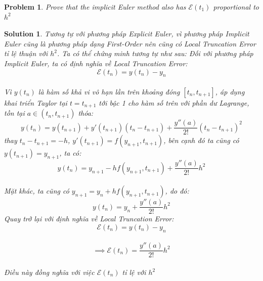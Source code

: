 \documentclass[a4paper]{article}
\newtheorem*{problem}{Problem}
\newtheorem*{sol}{Solution}
\begin{document}
\begin{problem}
    Prove that the implicit Euler method also has $\mathcal{E}(t_1)$ proportional
to $h^2$
\end{problem}
\begin{sol}
    Tương tự với phương pháp Explicit Euler, vì phương pháp Implicit Euler cũng là phương pháp dạng First-Order nên cũng có Local Truncation Error tỉ lệ thuận với $h^2$. Ta có thể chứng minh tương tự như sau:
    Đối với phương pháp Implicit Euler, ta có định nghĩa về Local Truncation Error: \\
    $$\mathcal{E}(t_{n}) = y(t_{n}) - y_{n}$$ \\
    Vì $y(t_n)$ là hàm số khả vi vô hạn lần trên khoảng đóng $[t_n, t_{n+1}]$, áp dụng khai triển Taylor tại $t = t_{n+1}$ tới bậc 1 cho hàm số trên với phần dư Lagrange, tồn tại $a \in (t_n, t_{n+1})$ thóa: \\
    $$y(t_n) = y(t_{n+1}) + y'(t_{n+1})(t_{n} - t_{n+1}) + \dfrac{y''(a)}{2!}(t_{n} - t_{n+1})^2$$
    thay $t_{n} - t_{n+1} = -h$, $y'(t_{n+1}) = f(y_{n+1}, t_{n+1})$, bên cạnh đó ta cũng có $y(t_{n+1}) = y_{n+1}$, ta có:  
    $$y(t_n) = y_{n+1} - hf(y_{n+1}, t_{n+1}) + \dfrac{y''(a)}{2!}h^2$$ \\
    Mặt khác, ta cũng có $y_{n+1} = y_n + hf(y_{n+1}, t_{n+1})$, do đó:
    $$y(t_n) = y_n + \dfrac{y''(a)}{2!}h^2$$
    Quay trở lại với định nghĩa về Local Truncation Error:\\
    $$\mathcal{E}(t_{n}) = y(t_{n}) - y_{n}$$ \\
    $$ \implies \mathcal{E}(t_{n}) = \dfrac{y''(a)}{2!}h^2$$ \\
    Điều này đồng nghĩa với việc $\mathcal{E}(t_n)$ tỉ lệ với $h^2$
    
    
\end{sol}
\end{document}
